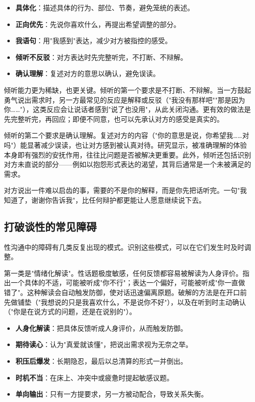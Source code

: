 \documentclass[12pt,UTF8]{ctexbook}
\newcommand{\keyword}[1]{\textbf{#1}}
\begin{document}
\begin{itemize}
  \item \keyword{具体化}：描述具体的行为、部位、节奏，避免笼统的表述。
  \item \keyword{正向优先}：先说你喜欢什么，再提出希望调整的部分。
  \item \keyword{我语句}：用"我感到"表达，减少对方被指控的感受。
  \item \keyword{倾听不反驳}：对方表达时先完整听完，不打断、不辩解。
  \item \keyword{确认理解}：复述对方的意思以确认，避免误读。
\end{itemize}

倾听能力更为稀缺，也更关键。倾听的第一个要求是不打断、不辩解。当一方鼓起勇气说出需求时，另一方最常见的反应是解释或反驳（"我没有那样吧""那是因为你……"），这类反应会让说话者感到"说了也没用"，从此关闭沟通。更有效的做法是先完整听完，再回应；即便不同意，也可以先承认对方的感受是真实的。

倾听的第二个要求是确认理解。复述对方的内容（"你的意思是说，你希望我……对吗"）能显著减少误读，也让对方感到被认真对待。研究显示，被准确理解的体验本身即有强烈的安抚作用，往往比问题是否被解决更重要。此外，倾听还包括识别对方未直说的部分——例如以抱怨形式表达的渴望，其背后通常是一个未被满足的需求。

\begin{tcolorbox}[colback=pink!5!white,colframe=red!50!black,title=贴心小叮咛]
对方说出一件难以启齿的事，需要的不是你的解释，而是你先把话听完。一句"我知道了，谢谢你告诉我"，比任何辩护都更能让人愿意继续说下去。
\end{tcolorbox}

\subsection{打破谈性的常见障碍}

性沟通中的障碍有几类反复出现的模式。识别这些模式，可以在它们发生时及时调整。

第一类是"情绪化解读"。性话题极度敏感，任何反馈都容易被解读为人身评价。指出一个具体的不适，可能被听成"你不行"；表达一个偏好，可能被听成"你一直做错了"。这种解读会自动触发防御，使对话迅速偏离原题。破解的方法是在开口前先做铺垫（"我想说的只是我喜欢什么，不是说你不好"），以及在听到时主动确认（"你是在说方式的问题，还是在说别的"）。

\begin{itemize}
  \item \keyword{人身化解读}：把具体反馈听成人身评价，从而触发防御。
  \item \keyword{期待读心}：认为"真爱就该懂"，把说出需求视为无奈之举。
  \item \keyword{积压后爆发}：长期隐忍，最后以总清算的形式一并倒出。
  \item \keyword{时机不当}：在床上、冲突中或疲惫时提起敏感议题。
  \item \keyword{单向输出}：只有一方提要求，另一方被动配合，导致关系失衡。
\end{itemize}
\end{document}

